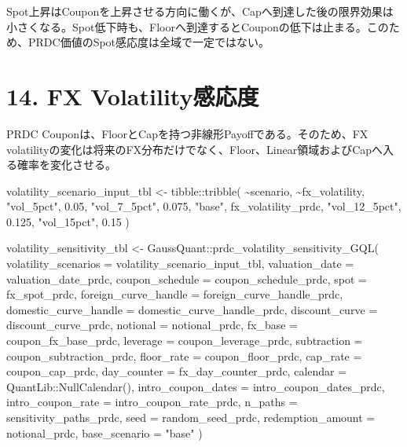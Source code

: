 \documentclass[
  letterpaper,
  DIV=11,
  numbers=noendperiod]{scrreprt}
\newenvironment{Shaded}{\begin{snugshade}}{\end{snugshade}}
\newcommand{\AttributeTok}[1]{\textcolor[rgb]{0.40,0.45,0.13}{#1}}
\newcommand{\FloatTok}[1]{\textcolor[rgb]{0.68,0.00,0.00}{#1}}
\newcommand{\FunctionTok}[1]{\textcolor[rgb]{0.28,0.35,0.67}{#1}}
\newcommand{\NormalTok}[1]{\textcolor[rgb]{0.00,0.23,0.31}{#1}}
\newcommand{\OtherTok}[1]{\textcolor[rgb]{0.00,0.23,0.31}{#1}}
\newcommand{\SpecialCharTok}[1]{\textcolor[rgb]{0.37,0.37,0.37}{#1}}
\newcommand{\StringTok}[1]{\textcolor[rgb]{0.13,0.47,0.30}{#1}}
\begin{document}
Spot上昇はCouponを上昇させる方向に働くが、Capへ到達した後の限界効果は小さくなる。Spot低下時も、Floorへ到達するとCouponの低下は止まる。このため、PRDC価値のSpot感応度は全域で一定ではない。

\section{14. FX Volatility感応度}\label{fx-volatilityux611fux5fdcux5ea6}

PRDC Couponは、FloorとCapを持つ非線形Payoffである。そのため、FX
volatilityの変化は将来のFX分布だけでなく、Floor、Linear領域およびCapへ入る確率を変化させる。

\begin{Shaded}
\begin{Highlighting}[]
\NormalTok{volatility\_scenario\_input\_tbl }\OtherTok{\textless{}{-}}\NormalTok{ tibble}\SpecialCharTok{::}\FunctionTok{tribble}\NormalTok{(}
  \SpecialCharTok{\textasciitilde{}}\NormalTok{scenario,     }\SpecialCharTok{\textasciitilde{}}\NormalTok{fx\_volatility,}
  \StringTok{"vol\_5pct"}\NormalTok{,     }\FloatTok{0.05}\NormalTok{,}
  \StringTok{"vol\_7\_5pct"}\NormalTok{,   }\FloatTok{0.075}\NormalTok{,}
  \StringTok{"base"}\NormalTok{,         fx\_volatility\_prdc,}
  \StringTok{"vol\_12\_5pct"}\NormalTok{,  }\FloatTok{0.125}\NormalTok{,}
  \StringTok{"vol\_15pct"}\NormalTok{,    }\FloatTok{0.15}
\NormalTok{)}

\NormalTok{volatility\_sensitivity\_tbl }\OtherTok{\textless{}{-}}\NormalTok{ GaussQuant}\SpecialCharTok{::}\FunctionTok{prdc\_volatility\_sensitivity\_GQL}\NormalTok{(}
  \AttributeTok{volatility\_scenarios =}\NormalTok{ volatility\_scenario\_input\_tbl,}
  \AttributeTok{valuation\_date =}\NormalTok{ valuation\_date\_prdc,}
  \AttributeTok{coupon\_schedule =}\NormalTok{ coupon\_schedule\_prdc,}
  \AttributeTok{spot =}\NormalTok{ fx\_spot\_prdc,}
  \AttributeTok{foreign\_curve\_handle =}\NormalTok{ foreign\_curve\_handle\_prdc,}
  \AttributeTok{domestic\_curve\_handle =}\NormalTok{ domestic\_curve\_handle\_prdc,}
  \AttributeTok{discount\_curve =}\NormalTok{ discount\_curve\_prdc,}
  \AttributeTok{notional =}\NormalTok{ notional\_prdc,}
  \AttributeTok{fx\_base =}\NormalTok{ coupon\_fx\_base\_prdc,}
  \AttributeTok{leverage =}\NormalTok{ coupon\_leverage\_prdc,}
  \AttributeTok{subtraction =}\NormalTok{ coupon\_subtraction\_prdc,}
  \AttributeTok{floor\_rate =}\NormalTok{ coupon\_floor\_prdc,}
  \AttributeTok{cap\_rate =}\NormalTok{ coupon\_cap\_prdc,}
  \AttributeTok{day\_counter =}\NormalTok{ fx\_day\_counter\_prdc,}
  \AttributeTok{calendar =}\NormalTok{ QuantLib}\SpecialCharTok{::}\FunctionTok{NullCalendar}\NormalTok{(),}
  \AttributeTok{intro\_coupon\_dates =}\NormalTok{ intro\_coupon\_dates\_prdc,}
  \AttributeTok{intro\_coupon\_rate =}\NormalTok{ intro\_coupon\_rate\_prdc,}
  \AttributeTok{n\_paths =}\NormalTok{ sensitivity\_paths\_prdc,}
  \AttributeTok{seed =}\NormalTok{ random\_seed\_prdc,}
  \AttributeTok{redemption\_amount =}\NormalTok{ notional\_prdc,}
  \AttributeTok{base\_scenario =} \StringTok{"base"}
\NormalTok{)}


\end{Highlighting}
\end{Shaded}
\end{document}
